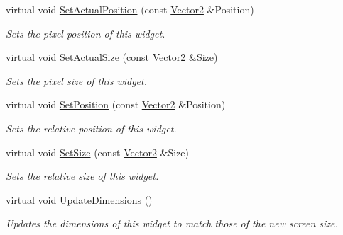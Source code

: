 \begin{DoxyCompactItemize}
virtual void \hyperlink{classMezzanine_1_1UI_1_1RenderableContainerWidget_a40f37509c36c3d131cfa8a29db49fd1d}{SetActualPosition} (const \hyperlink{classMezzanine_1_1Vector2}{Vector2} \&Position)
\begin{DoxyCompactList}\small\item\em Sets the pixel position of this widget. \item\end{DoxyCompactList}\item 
virtual void \hyperlink{classMezzanine_1_1UI_1_1RenderableContainerWidget_a036b474eb0d08197ee5130954a1ea992}{SetActualSize} (const \hyperlink{classMezzanine_1_1Vector2}{Vector2} \&Size)
\begin{DoxyCompactList}\small\item\em Sets the pixel size of this widget. \item\end{DoxyCompactList}\item 
virtual void \hyperlink{classMezzanine_1_1UI_1_1RenderableContainerWidget_a169f11799bf2f3642ddfae70832dff59}{SetPosition} (const \hyperlink{classMezzanine_1_1Vector2}{Vector2} \&Position)
\begin{DoxyCompactList}\small\item\em Sets the relative position of this widget. \item\end{DoxyCompactList}\item 
virtual void \hyperlink{classMezzanine_1_1UI_1_1RenderableContainerWidget_a672008c2b0340b36ca3041b858b570bc}{SetSize} (const \hyperlink{classMezzanine_1_1Vector2}{Vector2} \&Size)
\begin{DoxyCompactList}\small\item\em Sets the relative size of this widget. \item\end{DoxyCompactList}\item 
virtual void \hyperlink{classMezzanine_1_1UI_1_1RenderableContainerWidget_acfea936d03f85a2e6d289e50844d6b11}{UpdateDimensions} ()
\begin{DoxyCompactList}\small\item\em Updates the dimensions of this widget to match those of the new screen size. \item\end{DoxyCompactList}\end{DoxyCompactItemize}
